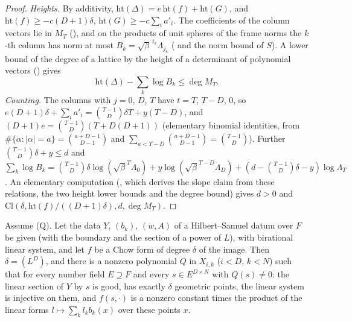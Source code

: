 \begin{proof}
\emph{Heights.} By additivity, $\mathrm{ht}(\Delta)=e\,\mathrm{ht}(f)+\mathrm{ht}(G)$, and
$\mathrm{ht}(f)\ge-c(D+1)\delta$, $\mathrm{ht}(G)\ge-c\sum_ia'_i$. The coefficients of the column vectors
lie in $M_T$ (), and on the
products of unit spheres of the frame norms the $k$-th column has norm at most
$B_k=\sqrt\beta^{\,t_k}\Lambda_{j_k}$ (
and the norm bound of $S$). A lower bound of the degree of a lattice by the height of a determinant of
polynomial vectors () gives
\[
\mathrm{ht}(\Delta)-\sum_k\log B_k\le\deg M_T .
\]
\emph{Counting.} The columns with $j=0$, $D$, $T$ have $t=T$, $T-D$, $0$, so
$e(D+1)\delta+\sum_ia'_i=\binom{T-1}D\delta T+y(T-D)$, and
$(D+1)e=\binom{T-1}D(T+D(D+1))$ (elementary binomial identities, from
$\#\{\alpha:|\alpha|=a\}=\binom{a+D-1}{D-1}$ and $\sum_{a<T-D}\binom{a+D-1}{D-1}=\binom{T-1}D$). Further
$\binom{T-1}D\delta+y\le d$ and
$\sum_k\log B_k=\binom{T-1}D\delta\log(\sqrt\beta^T\Lambda_0)+y\log(\sqrt\beta^{T-D}\Lambda_D)
+(d-\binom{T-1}D\delta-y)\log\Lambda_T$. An elementary computation
(, which derives the slope claim from these relations,
the two height lower bounds and the degree bound) gives $d>0$ and
$\mathrm{Cl}(\delta,\mathrm{ht}(f)/((D+1)\delta),d,\deg M_T)$.
\end{proof}

\begin{theorem}\label{pf:lift1:bertini}
Assume (Q). Let the data $Y$, $(b_k)$, $(w,A)$ of a Hilbert--Samuel datum over $F$ be given (with the
boundary and the section of a power of $L$), with birational linear system, and let $f$ be a Chow form of
degree $\delta$ of the image. Then $\delta=(L^D)$, and there is a nonzero polynomial $Q$ in $X_{i,k}$
($i<D$, $k<N$) such that for every number field $E\supseteq F$ and every $s\in E^{D\times N}$ with
$Q(s)\ne0$: the linear section of $Y$ by $s$ is good, has exactly $\delta$ geometric points, the linear
system is injective on them, and $f(s,\cdot)$ is a nonzero constant times the product of the linear forms
$l\mapsto\sum_kl_kb_k(x)$ over these points $x$.
\end{theorem}

